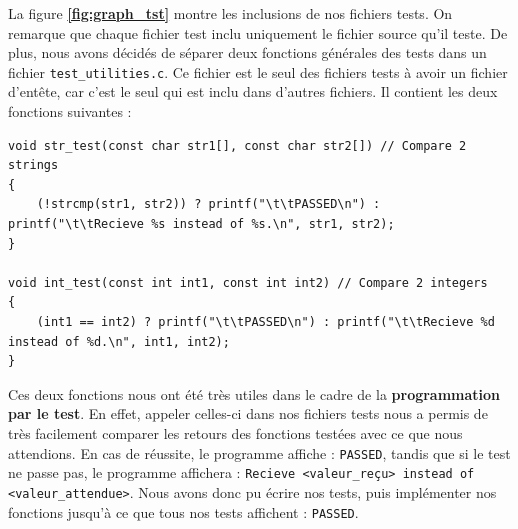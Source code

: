         La figure \textbf{\ref{fig:graph_tst}} montre les inclusions de nos fichiers tests. On remarque que chaque fichier test inclu uniquement le fichier source qu'il teste. De plus, nous avons décidés de séparer deux fonctions générales des tests dans un fichier \texttt{test\_utilities.c}. Ce fichier est le seul des fichiers tests à avoir un fichier d'entête, car c'est le seul qui est inclu dans d'autres fichiers. Il contient les deux fonctions suivantes :
        
        \begin{lstlisting}
void str_test(const char str1[], const char str2[]) // Compare 2 strings
{ 
    (!strcmp(str1, str2)) ? printf("\t\tPASSED\n") : printf("\t\tRecieve %s instead of %s.\n", str1, str2);
}

void int_test(const int int1, const int int2) // Compare 2 integers
{
    (int1 == int2) ? printf("\t\tPASSED\n") : printf("\t\tRecieve %d instead of %d.\n", int1, int2);
}\end{lstlisting}

        Ces deux fonctions nous ont été très utiles dans le cadre de la \textbf{programmation par le test}. En effet, appeler celles-ci dans nos fichiers tests nous a permis de très facilement comparer les retours des fonctions testées avec ce que nous attendions. En cas de réussite, le programme affiche : \texttt{PASSED}, tandis que si le test ne passe pas, le programme affichera : \texttt{Recieve <valeur\_reçu> instead of <valeur\_attendue>}.
        \medbreak
        Nous avons donc pu écrire nos tests, puis implémenter nos fonctions jusqu'à ce que tous nos tests affichent : \texttt{PASSED}.
        

        
    